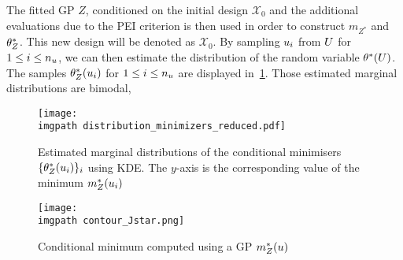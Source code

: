 \documentclass[../../Main_ManuscritThese.tex]{subfiles}
\newcommand\imgpath{/home/victor/acadwriting/Manuscrit/Text/Chapter5/img/}
\begin{document}
The fitted GP $Z$, conditioned on the initial design $\mathcal{X}_0$
and the additional evaluations due to the PEI criterion is then used
in order to construct $m_{Z^*}$ and $\theta^*_Z$. This new design will be
denoted as $\mathcal{X}_0$. By sampling $u_i$ from
$U$ for $1\leq i \leq n_{u}$, we can then estimate
the distribution of the random variable $\theta^*(U)$. The samples
$\theta^*_Z(u_i)$ for $1\leq i \leq n_{u}$ are displayed
in~\cref{fig:distrib_minimizers_reduced}. Those estimated marginal
distributions are bimodal, %
\begin{figure}[ht]
  \centering
  \texttt{[image: \\imgpath distribution\_minimizers\_reduced.pdf]}
  \caption{\label{fig:distrib_minimizers_reduced} Estimated marginal
    distributions of the conditional minimisers $\{\theta^*_Z(u_i)\}_i$
    using KDE. The $y$-axis is the corresponding value of the minimum
    $m_Z^*(u_i)$}
\end{figure}

\begin{figure}[ht]
  \centering
  \texttt{[image: \\imgpath contour\_Jstar.png]}
  \caption{\label{fig:contour_Jstar} Conditional minimum computed using a GP $m_Z^*(u)$}
\end{figure}
\end{document}
